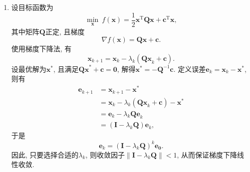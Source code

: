 \begin{enumerate}
    \item
        设目标函数为
        \begin{equation*}
            \min_{\bm{x}}~f(\bm{x})=\frac{1}{2}\bm{x}^\mathrm{T}\bm{Qx}+\bm{c}^\mathrm{T}\bm{x},
        \end{equation*}
        其中矩阵$\bm{Q}$正定, 且梯度
        \begin{equation*}
            \nabla f(\bm{x})=\bm{Qx}+\bm{c}.
        \end{equation*}
        使用梯度下降法, 有
        \begin{equation*}
            \bm{x}_{k+1}=\bm{x}_k-\lambda_k(\bm{Qx}_k+\bm{c}).
        \end{equation*}
        设最优解为$\bm{x}^*$, 且满足$\bm{Qx}^*+\bm{c}=\bm{0}$, 解得$\bm{x}^*=-\bm{Q}^{-1}\bm{c}$.
        定义误差$\bm{e}_k=\bm{x}_k-\bm{x}^*$, 则有
        \begin{align*}
            \bm{e}_{k+1}
            &=\bm{x}_{k+1}-\bm{x}^* \\
            &=\bm{x}_k-\lambda_k(\bm{Qx}_k+\bm{c})-\bm{x}^* \\
            &=\bm{e}_k-\lambda_k\bm{Qe}_k \\
            &=(\bm{I}-\lambda_k\bm{Q})\bm{e}_k,
        \end{align*}
        于是
        \begin{equation*}
            \bm{e}_k=(\bm{I}-\lambda_k\bm{Q})^k\bm{e_0}.
        \end{equation*}
        因此, 只要选择合适的$\lambda_k$, 则收敛因子$\|\bm{I}-\lambda_k\bm{Q}\|<1$, 从而保证梯度下降线性收敛.
\end{enumerate}
